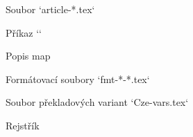  Soubor `article-*.tex`

 Příkaz `\putCite`

 Popis map

 Formátovací soubory `fmt-*-*.tex`

 Soubor překladových variant `Cze-vars.tex`






\vfill\eject

\sec Rejstřík

\def\_sortinglang{en}
\typosize[9/]
\makeindex
\endmulti

\bye
